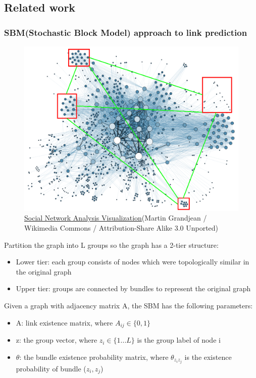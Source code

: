 \documentclass{article}
\begin{document}
\subsection{Related work}

\subsubsection{SBM(Stochastic Block Model) approach to link prediction}
\begin{figure}[H]
	\centering
	\includegraphics[width=\linewidth]{SBM}
	\caption{ \href{https://commons.wikimedia.org/wiki/File:Social_Network_Analysis_Visualization.png}{Social Network Analysis Visualization}(Martin Grandjean / Wikimedia Commons / Attribution-Share Alike 3.0 Unported)}
	\label{fig:SBM}
\end{figure}
Partition the graph into L groups so the graph has a 2-tier structure:
\begin{itemize}
	\item Lower tier: each group consists of nodes which were topologically similar in the original graph
	\item Upper tier: groups are connected by bundles to represent the original graph
\end{itemize}
Given a graph with adjacency matrix A, the SBM has the following parameters:
\begin{itemize}
	\item A: link existence matrix, where $ A_{ij} \in \{0, 1\} $
	\item z: the group vector,
	where $ z_i \in \{ 1 ... L \} $ is the group label of node i
	\item $ \theta $: the bundle existence probability matrix,
	where $ \theta_{z_i z_j} $ is the existence probability of bundle ($z_i, z_j$)
\end{itemize}
\end{document}
